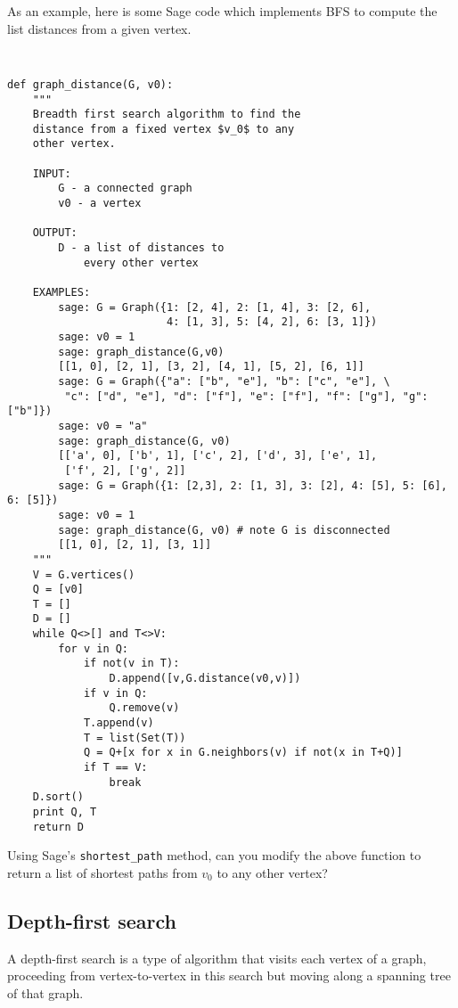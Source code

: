 As an example, here is some Sage code which implements BFS to compute
the list distances from a given vertex.
%
\begin{center}
\fontsize{9pt}{9pt}
\selectfont
\tt
\begin{lstlisting}
def graph_distance(G, v0):
    """
    Breadth first search algorithm to find the
    distance from a fixed vertex $v_0$ to any
    other vertex.

    INPUT:
        G - a connected graph
        v0 - a vertex

    OUTPUT:
        D - a list of distances to
            every other vertex

    EXAMPLES:
        sage: G = Graph({1: [2, 4], 2: [1, 4], 3: [2, 6],
                         4: [1, 3], 5: [4, 2], 6: [3, 1]})
        sage: v0 = 1
        sage: graph_distance(G,v0)
        [[1, 0], [2, 1], [3, 2], [4, 1], [5, 2], [6, 1]]
        sage: G = Graph({"a": ["b", "e"], "b": ["c", "e"], \
         "c": ["d", "e"], "d": ["f"], "e": ["f"], "f": ["g"], "g":["b"]})
        sage: v0 = "a"
        sage: graph_distance(G, v0)
        [['a', 0], ['b', 1], ['c', 2], ['d', 3], ['e', 1],
         ['f', 2], ['g', 2]]
        sage: G = Graph({1: [2,3], 2: [1, 3], 3: [2], 4: [5], 5: [6], 6: [5]})
        sage: v0 = 1
        sage: graph_distance(G, v0) # note G is disconnected
        [[1, 0], [2, 1], [3, 1]]
    """
    V = G.vertices()
    Q = [v0]
    T = []
    D = []
    while Q<>[] and T<>V:
        for v in Q:
            if not(v in T):
                D.append([v,G.distance(v0,v)])
            if v in Q:
                Q.remove(v)
            T.append(v)
            T = list(Set(T))
            Q = Q+[x for x in G.neighbors(v) if not(x in T+Q)]
            if T == V:
                break
    D.sort()
    print Q, T
    return D
\end{lstlisting}
\end{center}
%
\begin{exercise}
Using Sage's \verb!shortest_path! method, can you modify the above
function to return a list of shortest paths from $v_0$ to any other
vertex?
\end{exercise}



\subsection{Depth-first search}

A depth-first search is a type of algorithm that visits each vertex of
a graph, proceeding from vertex-to-vertex in this search but moving
along a spanning tree of that graph.

